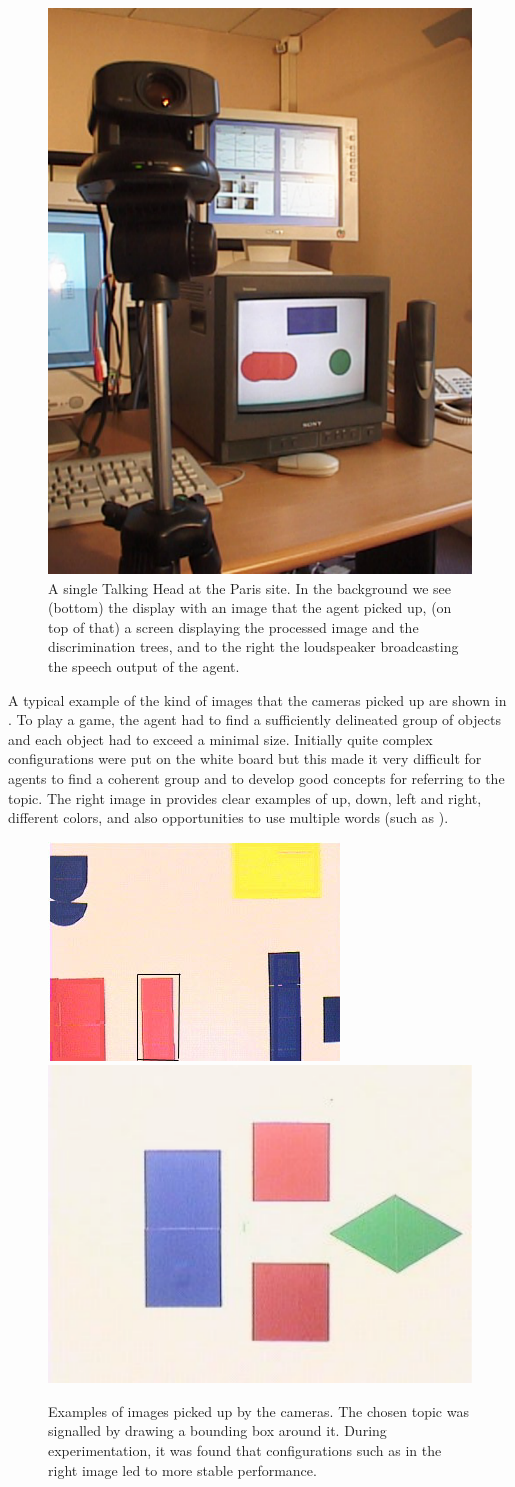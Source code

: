 \begin{figure}[htbp]
 \centerline{\includegraphics[width=.35\textwidth]{chap8/figures/zoom-in-head.pdf}}
\caption{\label{fig:laboratorium}A single Talking Head at the Paris site. In the background we see (bottom) the display with an
image that the agent picked up, (on top of that) a screen displaying the processed image and the discrimination trees, 
and to the right the loudspeaker broadcasting the speech output of the agent.}
\end{figure}

A typical example of the kind of images that the cameras picked up are shown in . 
To play a game, the agent had to find a sufficiently delineated group of objects and each object had 
to exceed a minimal size. Initially quite complex configurations were put on the white board but this made it very difficult for agents to find a coherent group and to develop good concepts for referring to the topic. The right 
image in  provides clear examples of up, down, left and right, different colors, and 
also opportunities to use multiple words (such as ). 

\begin{figure}[htbp]
 \centerline{\includegraphics[width=.40\textwidth]{chap8/figures/image-1.jpg}
\includegraphics[width=.40\textwidth]{chap8/figures/image-2.pdf}}
\caption{\label{fig:images}Examples of images picked up by the cameras. The chosen topic was signalled by drawing a bounding box around it. 
During experimentation, it was found that configurations such as in the right image led to more stable performance.} 
\end{figure}

